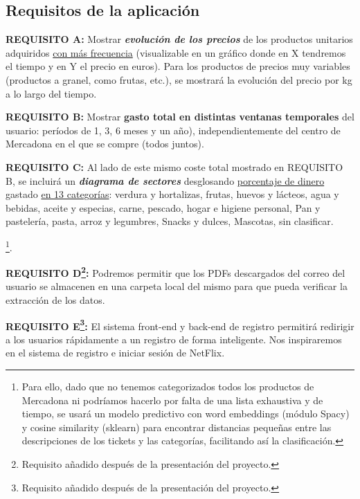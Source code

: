 \documentclass[a4paper,12pt]{report}
\begin{document}
		
			\subsection{Requisitos de la aplicación}
			\label{sec:requisitosAplicacion}
			
		

			

			
		
			
			\textbf{REQUISITO A:} Mostrar\textbf{ \textit{evolución de los precios}} de los productos unitarios adquiridos \underline{con más frecuencia} (visualizable en un gráfico donde en X tendremos el tiempo y en Y el precio en euros). Para los productos de precios muy variables (productos a granel, como frutas, etc.), se mostrará la evolución del precio por kg a lo largo del tiempo.
			
			\textbf{REQUISITO B:} Mostrar {\textbf{gasto total en distintas ventanas temporales}} del usuario: períodos de 1, 3, 6 meses y un año), independientemente del centro de Mercadona en el que se compre (todos juntos).
			
			\textbf{REQUISITO C:} Al lado de este mismo coste total mostrado en REQUISITO B, se incluirá un \textbf{\textit{diagrama de sectores}} desglosando \underline{porcentaje de dinero} gastado \underline{en 13 categorías}: verdura y hortalizas, frutas, huevos y lácteos, agua y bebidas, aceite y especias, carne, pescado, hogar e higiene personal, Pan y pastelería, pasta, arroz y legumbres, Snacks y dulces, Mascotas, sin clasificar.
			
			
			\footnote{Para ello, dado que no tenemos categorizados todos los productos de Mercadona ni podríamos hacerlo por falta de una lista exhaustiva y de tiempo, se usará un modelo predictivo con word embeddings (módulo Spacy) y cosine similarity (sklearn) para encontrar distancias pequeñas entre las descripciones de los tickets y las categorías, facilitando así la clasificación.}.
			
			
			\textbf{REQUISITO D\footnote{Requisito añadido después de la presentación del proyecto.}:} Podremos permitir que los PDFs descargados del correo del usuario se almacenen en una carpeta local del mismo para que pueda verificar la extracción de los datos.
			
			\textbf{REQUISITO E\footnote{Requisito añadido después de la presentación del proyecto.}:} El sistema front-end y back-end de registro permitirá redirigir a los usuarios rápidamente a un registro de forma inteligente. Nos inspiraremos en el sistema de  registro e iniciar sesión de NetFlix.
			
\end{document}
